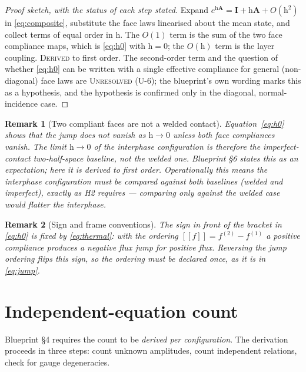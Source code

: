 \documentclass[11pt]{article}
\newcommand{\jmp}[1]{[\![#1]\!]}
\theoremstyle{plain}
\newtheorem{remark}{Remark}
\begin{document}
\begin{proof}[Proof sketch, with the status of each step stated]
Expand $e^{\mathrm{h}\bm{A}} = \bm{I} + \mathrm{h}\bm{A} + O(\mathrm{h}^2)$ in
\eqref{eq:composite}, substitute the face laws linearised about the mean state,
and collect terms of equal order in $\mathrm{h}$. The $O(1)$ term is the sum of
the two face compliance maps, which is \eqref{eq:h0} with $\mathrm{h}=0$; the
$O(\mathrm{h})$ term is the layer coupling. \textsc{Derived} to first order.
The second-order term and the question of whether \eqref{eq:h0} can be written
with a single effective compliance for general (non-diagonal) face laws are
\textsc{Unresolved} (U-6); the blueprint's own wording marks this as a hypothesis,
and the hypothesis is confirmed only in the diagonal, normal-incidence case.
\end{proof}

\begin{remark}[Two compliant faces are not a welded contact]
\label{rem:not-welded}
Equation~\eqref{eq:h0} shows that the jump does \emph{not} vanish as
$\mathrm{h}\to0$ unless both face compliances vanish. The limit
$\mathrm{h}\to0$ of the interphase configuration is therefore the
\emph{imperfect-contact} two-half-space baseline, not the welded one. Blueprint
\S6 states this as an expectation; here it is derived to first order. Operationally
this means the interphase configuration must be compared against \emph{both}
baselines (welded and imperfect), exactly as H2 requires --- comparing only
against the welded case would flatter the interphase.
\end{remark}

\begin{remark}[Sign and frame conventions]
The sign in front of the bracket in \eqref{eq:h0} is fixed by
\eqref{eq:thermal}: with the ordering $\jmp{f}=f^{(2)}-f^{(1)}$ a positive
compliance produces a negative flux jump for positive flux. Reversing the jump
ordering flips this sign, so the ordering must be declared once, as it is in
\eqref{eq:jump}.
\end{remark}

\section{Independent-equation count}
\label{sec:count}

Blueprint \S4 requires the count to be \emph{derived per configuration}. The
derivation proceeds in three steps: count unknown amplitudes, count independent
relations, check for gauge degeneracies.
\end{document}
